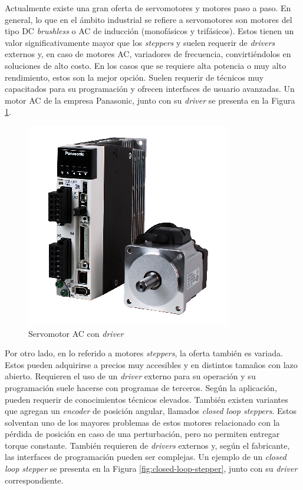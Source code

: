 Actualmente existe una gran oferta de servomotores y motores paso a paso. En general, lo que en el ámbito industrial se refiere a servomotores\citep{Industrial_Automation_Hands_On} son motores del tipo DC \textit{brushless} o AC de inducción (monofásicos y trifásicos). Estos tienen un valor significativamente mayor que los \textit{steppers} y suelen requerir de \textit{drivers} externos y, en caso de motores AC, variadores de frecuencia, convirtiéndolos en soluciones de alto costo. En los casos que se requiere alta potencia o muy alto rendimiento, estos son la mejor opción. Suelen requerir de técnicos muy capacitados para su programación y ofrecen interfaces de usuario avanzadas. Un motor AC de la empresa Panasonic, junto con su \textit{driver} se presenta en la Figura \ref{fig:ac-servo}.


\begin{figure}[htbp]
	\centering
	\includegraphics[scale=.8]{./Figures/ac-servo.png}
	\caption{Servomotor AC con \textit{driver}\protect\footnotemark}
	\label{fig:ac-servo}
\end{figure}


Por otro lado, en lo referido a motores \textit{steppers}, la oferta también es variada. Estos pueden adquirirse a precios muy accesibles y en distintos tamaños con lazo abierto. Requieren el uso de un \textit{driver} externo para su operación y su programación suele hacerse con programas de terceros. Según la aplicación, pueden requerir de conocimientos técnicos elevados. También existen variantes que agregan un \textit{encoder} de posición angular,  llamados \textit{closed loop steppers}. Estos solventan uno de los mayores problemas de estos motores relacionado con la pérdida de posición en caso de una perturbación, pero no permiten entregar torque constante. También requieren de \textit{drivers} externos y, según el fabricante, las interfaces de programación pueden ser complejas. Un ejemplo de un \textit{closed loop stepper} se presenta en la Figura \ref{fig:closed-loop-stepper}, junto con su \textit{driver} correspondiente.


